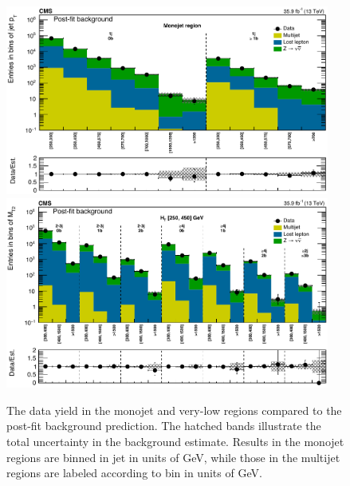 \begin{figure}
	\centering
	\includegraphics[width=0.95\textwidth]{results/figs/postfit/mt2_monojet_fullEstimate}
	\includegraphics[width=0.95\textwidth]{results/figs/postfit/mt2_veryLowHT_fullEstimate}
	\caption{The data yield in the monojet and very-low \HT regions compared to the post-fit background prediction. The hatched bands illustrate the total uncertainty in the background estimate. Results in the monojet regions are binned in jet \pt in units of GeV, while those in the multijet regions are labeled according to \mttwo bin in units of GeV.}
	\label{fig:yieldPostfit1}
\end{figure}
